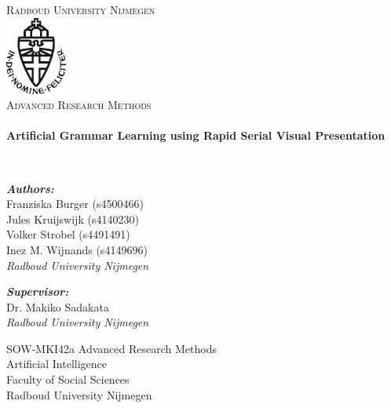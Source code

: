 \begin{titlepage}
\begin{center}

\textsc{\LARGE Radboud University Nijmegen}\\[1cm]

\includegraphics[width=0.15\textwidth]{media/ru-logo}~\\[1cm]

\textsc{\Large Advanced Research Methods}\\[0.6cm]

\HRule \\[0.4cm]
{ \huge \bfseries Artificial Grammar Learning using Rapid Serial Visual Presentation \\[0.4cm] }

\HRule \\[1.2cm]

\begin{flushleft} \large
\emph{\textbf{Authors:}}\\
Franziska Burger (s4500466)\\
Jules Kruijswijk (s4140230)\\
Volker Strobel (s4491491)\\
Inez M. Wijnands (s4149696)\\
\emph{Radboud University Nijmegen}\\
\end{flushleft}
\begin{flushleft} \large
\emph{\textbf{Supervisor:}} \\
Dr. Makiko Sadakata\\
\emph{Radboud University Nijmegen}\\
\end{flushleft}


\vfill

SOW-MKI42a Advanced Research Methods\\
Artificial Intelligence\\
Faculty of Social Sciences\\
Radboud University Nijmegen\\
\vspace{0.2cm}
\date{\large\today} %

\end{center}
\end{titlepage}